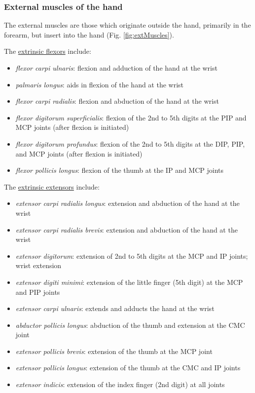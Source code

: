 \documentclass[12pt]{article}
\begin{document}
\subsubsection*{External muscles of the hand}

The external muscles are those which originate outside the hand, primarily in the forearm, but insert into the hand \citep{openStaxMuscles,tortora2014principles,ombregt2013applied} (Fig. \ref{fig:extMuscles}). 

The \underline{extrinsic flexors} include: 
\begin{itemize}
    \item \textit{flexor carpi ulnaris}: flexion and adduction of the hand at the wrist
    \item \textit{palmaris longus}: aids in flexion of the hand at the wrist
    \item \textit{flexor carpi radialis}: flexion and abduction of the hand at the wrist
    \item \textit{flexor digitorum superficialis}: flexion of the 2nd to 5th digits at the PIP and MCP joints (after flexion is initiated)
    \item \textit{flexor digitorum profundus}: flexion of the 2nd to 5th digits at the DIP, PIP, and MCP joints (after flexion is initiated)
    \item \textit{flexor pollicis longus}: flexion of the thumb at the IP and MCP joints
\end{itemize}

The \underline{extrinsic extensors} include: 
\begin{itemize}
    \item \textit{extensor carpi radialis longus}: extension and abduction of the hand at the wrist
    \item \textit{extensor carpi radialis brevis}: extension and abduction of the hand at the wrist
    \item \textit{extensor digitorum}: extension of 2nd to 5th digits at the MCP and IP joints; wrist extension
    \item \textit{extensor digiti minimi}: extension of the little finger (5th digit) at the MCP and PIP joints
    \item \textit{extensor carpi ulnaris}: extends and adducts the hand at the wrist
    \item \textit{abductor pollicis longus}: abduction of the thumb and extension at the CMC joint
    \item \textit{extensor pollicis brevis}: extension of the thumb at the MCP joint
    \item \textit{extensor pollicis longus}: extension of the thumb at the CMC and IP joints
    \item \textit{extensor indicis}: extension of the index finger (2nd digit) at all joints
\end{itemize}
\end{document}
